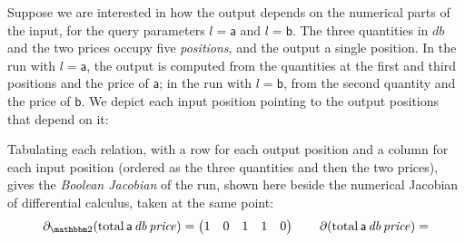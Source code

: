 \begin{example}
  Suppose we are interested in how the output depends on the numerical parts of the input, for the
  query parameters $l = \mathsf{a}$ and $l = \mathsf{b}$. The three quantities in $\mathit{db}$
  and the two prices occupy five \emph{positions}, and the output a single position. In the run with $l =
  \mathsf{a}$, the output is computed from the quantities at the first and third positions and the price of
  $\mathsf{a}$; in the run with $l = \mathsf{b}$, from the second quantity and the price of
  $\mathsf{b}$. We depict each input position
  pointing to the output positions that depend on it:
  \begin{center}
  \end{center}
    Tabulating each relation, with a row for each output position and a column for each input position
  (ordered as the three quantities and then the two prices), gives the \emph{Boolean Jacobian} of the run,
  shown here beside the numerical Jacobian of differential calculus, taken at the same point:
  \begin{displaymath}
    \partial_{\Two}(\mathrm{total}\,\mathsf{a}\,\mathit{db}\,\mathit{price}) =
    \begin{pmatrix} 1 & 0 & 1 & 1 & 0 \end{pmatrix}
    \qquad
    \partial(\mathrm{total}\,\mathsf{a}\,\mathit{db}\,\mathit{price}) =

\end{displaymath}
\end{example}
